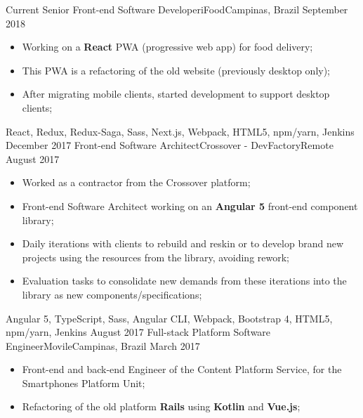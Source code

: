 %
%
%

\begin{experiences}
  \experience
    {Current}   {Senior Front-end Software Developer}{iFood}{Campinas, Brazil}
    {September 2018} {
    \begin{itemize}
      \item Working on a \textbf{React} PWA (progressive web app) for food delivery;
      \item This PWA is a refactoring of the old website (previously desktop only);
      \item After migrating mobile clients, started development to support desktop clients;
    \end{itemize}
  }
  {React, Redux, Redux-Saga, Sass, Next.js, Webpack, HTML5, npm/yarn, Jenkins}
  \emptySeparator
  \experience
    {December 2017}   {Front-end Software Architect}{Crossover - DevFactory}{Remote}
    {August 2017} {
    \begin{itemize}
      \item Worked as a contractor from the Crossover platform;
      \item Front-end Software Architect working on an \textbf{Angular 5} front-end component library;
      \item Daily iterations with clients to rebuild and reskin or to develop brand new projects using the resources from the library, avoiding rework;
      \item Evaluation tasks to consolidate new demands from these iterations into the library as new components/specifications;
    \end{itemize}
  }
  {Angular 5, TypeScript, Sass, Angular CLI, Webpack, Bootstrap 4, HTML5, npm/yarn, Jenkins}
  \emptySeparator
  \experience
    {August 2017}   {Full-stack Platform Software Engineer}{Movile}{Campinas, Brazil}
    {March 2017} {
    \begin{itemize}
      \item Front-end and back-end Engineer of the Content Platform Service, for the Smartphones Platform Unit;
      \item Refactoring of the old platform \textbf{Rails} using \textbf{Kotlin} and \textbf{Vue.js};

\end{itemize}}
\end{experiences}
